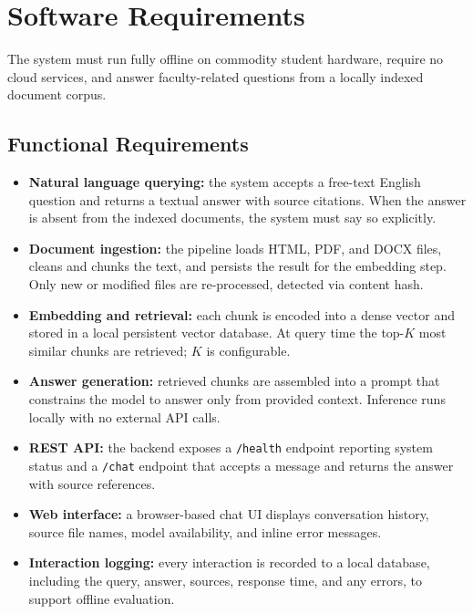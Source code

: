 \chapter{Software Requirements}
\label{ch:requirements}

The system must run fully offline on commodity student hardware, require no cloud services, and answer faculty-related questions from a locally indexed document corpus.

\section{Functional Requirements}
\label{sec:req-functional}

\begin{itemize}
    \item \textbf{Natural language querying:} the system accepts a free-text English question and returns a textual answer with source citations. When the answer is absent from the indexed documents, the system must say so explicitly.

    \item \textbf{Document ingestion:} the pipeline loads HTML, PDF, and DOCX files, cleans and chunks the text, and persists the result for the embedding step. Only new or modified files are re-processed, detected via content hash.

    \item \textbf{Embedding and retrieval:} each chunk is encoded into a dense vector and stored in a local persistent vector database. At query time the top-$K$ most similar chunks are retrieved; $K$ is configurable.

    \item \textbf{Answer generation:} retrieved chunks are assembled into a prompt that constrains the model to answer only from provided context. Inference runs locally with no external API calls.

    \item \textbf{REST API:} the backend exposes a \texttt{/health} endpoint reporting system status and a \texttt{/chat} endpoint that accepts a message and returns the answer with source references.

    \item \textbf{Web interface:} a browser-based chat UI displays conversation history, source file names, model availability, and inline error messages.

    \item \textbf{Interaction logging:} every interaction is recorded to a local database, including the query, answer, sources, response time, and any errors, to support offline evaluation.
\end{itemize}

